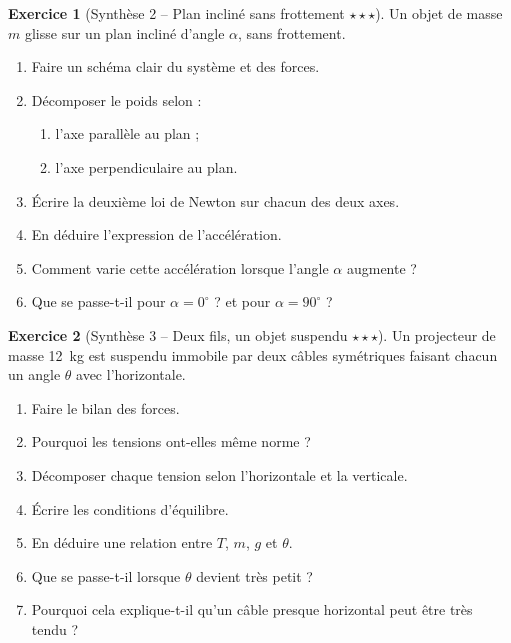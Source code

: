 \documentclass[11pt,a4paper]{article}
\theoremstyle{definition}
\newtheorem{exercice}{Exercice}[section]
\newcommand{\etoiles}[1]{\hfill{\small\textbf{#1}}}
\begin{document}
\begin{exercice}[Synthèse 2 -- Plan incliné sans frottement \etoiles{$\star\star\star$}]
Un objet de masse $m$ glisse sur un plan incliné d’angle $\alpha$, sans frottement.

\begin{enumerate}[label=\arabic*.]
    \item Faire un schéma clair du système et des forces.
    \item Décomposer le poids selon :
    \begin{enumerate}[label=\alph*)]
        \item l’axe parallèle au plan ;
        \item l’axe perpendiculaire au plan.
    \end{enumerate}
    \item Écrire la deuxième loi de Newton sur chacun des deux axes.
    \item En déduire l’expression de l’accélération.
    \item Comment varie cette accélération lorsque l’angle $\alpha$ augmente ?
    \item Que se passe-t-il pour $\alpha=0^\circ$ ? et pour $\alpha=90^\circ$ ?
\end{enumerate}
\end{exercice}

\begin{exercice}[Synthèse 3 -- Deux fils, un objet suspendu \etoiles{$\star\star\star$}]
Un projecteur de masse \SI{12}{kg} est suspendu immobile par deux câbles symétriques faisant chacun
un angle $\theta$ avec l’horizontale.

\begin{enumerate}[label=\arabic*.]
    \item Faire le bilan des forces.
    \item Pourquoi les tensions ont-elles même norme ?
    \item Décomposer chaque tension selon l’horizontale et la verticale.
    \item Écrire les conditions d’équilibre.
    \item En déduire une relation entre $T$, $m$, $g$ et $\theta$.
    \item Que se passe-t-il lorsque $\theta$ devient très petit ?
    \item Pourquoi cela explique-t-il qu’un câble presque horizontal peut être très tendu ?
\end{enumerate}
\end{exercice}
\end{document}
